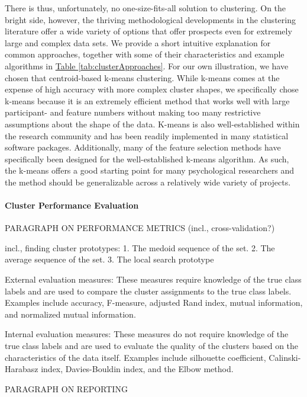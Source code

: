 \documentclass[man, 12pt, a4paper, mask, floatsintext]{apa7}
\theoremstyle{break}
\theoremstyle{plain}
\newcommand{\tblref}[2][]{\hyperref[#2]{Table \ref*{#2}#1}}
\begin{document}
There is thus, unfortunately, no one-size-fits-all solution to clustering. On the bright side, however, the thriving methodological developments in the clustering literature offer a wide variety of options that offer prospects even for extremely large and complex data sets. We provide a short intuitive explanation for common approaches, together with some of their characteristics and example algorithms in \tblref{tab:clusterApproaches}. For our own illustration, we have chosen that centroid-based k-means clustering. While k-means comes at the expense of high accuracy with more complex cluster shapes, we specifically chose k-means because it is an extremely efficient method that works well with large participant- and feature numbers without making too many restrictive assumptions about the shape of the data. K-means is also well-established within the research community and has been readily implemented in many statistical software packages. Additionally, many of the feature selection methods have specifically been designed for the well-established k-means algorithm. As such, the k-means offers a good starting point for many psychological researchers and the method should be generalizable across a relatively wide variety of projects.

\paragraph{Cluster Performance Evaluation}

PARAGRAPH ON PERFORMANCE METRICS (incl., cross-validation?)

incl., finding cluster prototypes:
1. The medoid sequence of the set. 2. The average sequence of the set. 3. The local search prototype

External evaluation measures: These measures require knowledge of the true class labels and are used to compare the cluster assignments to the true class labels. Examples include accuracy, F-measure, adjusted Rand index, mutual information, and normalized mutual information.

Internal evaluation measures: These measures do not require knowledge of the true class labels and are used to evaluate the quality of the clusters based on the characteristics of the data itself. Examples include silhouette coefficient, Calinski-Harabasz index, Davies-Bouldin index, and the Elbow method.

PARAGRAPH ON REPORTING \citep[e.g.,][]{vandeschoot2017}


\end{document}
